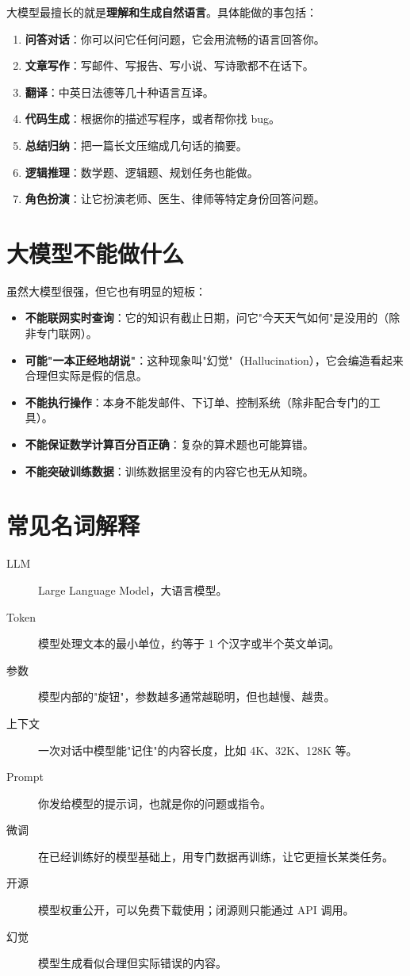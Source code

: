\documentclass[12pt,UTF8]{ctexbook}
\begin{document}
大模型最擅长的就是\textbf{理解和生成自然语言}。具体能做的事包括：

\begin{enumerate}
  \item \textbf{问答对话}：你可以问它任何问题，它会用流畅的语言回答你。
  \item \textbf{文章写作}：写邮件、写报告、写小说、写诗歌都不在话下。
  \item \textbf{翻译}：中英日法德等几十种语言互译。
  \item \textbf{代码生成}：根据你的描述写程序，或者帮你找 bug。
  \item \textbf{总结归纳}：把一篇长文压缩成几句话的摘要。
  \item \textbf{逻辑推理}：数学题、逻辑题、规划任务也能做。
  \item \textbf{角色扮演}：让它扮演老师、医生、律师等特定身份回答问题。
\end{enumerate}

\section{大模型不能做什么}

虽然大模型很强，但它也有明显的短板：

\begin{itemize}
  \item \textbf{不能联网实时查询}：它的知识有截止日期，问它"今天天气如何"是没用的（除非专门联网）。
  \item \textbf{可能"一本正经地胡说"}：这种现象叫"幻觉"（Hallucination），它会编造看起来合理但实际是假的信息。
  \item \textbf{不能执行操作}：本身不能发邮件、下订单、控制系统（除非配合专门的工具）。
  \item \textbf{不能保证数学计算百分百正确}：复杂的算术题也可能算错。
  \item \textbf{不能突破训练数据}：训练数据里没有的内容它也无从知晓。
\end{itemize}

\section{常见名词解释}

\begin{description}
  \item[LLM] Large Language Model，大语言模型。
  \item[Token] 模型处理文本的最小单位，约等于 1 个汉字或半个英文单词。
  \item[参数] 模型内部的"旋钮"，参数越多通常越聪明，但也越慢、越贵。
  \item[上下文] 一次对话中模型能"记住"的内容长度，比如 4K、32K、128K 等。
  \item[Prompt] 你发给模型的提示词，也就是你的问题或指令。
  \item[微调] 在已经训练好的模型基础上，用专门数据再训练，让它更擅长某类任务。
  \item[开源] 模型权重公开，可以免费下载使用；闭源则只能通过 API 调用。
  \item[幻觉] 模型生成看似合理但实际错误的内容。
\end{description}
\end{document}

